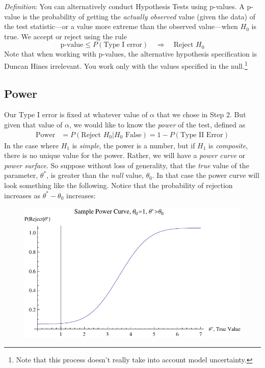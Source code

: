 \documentclass[a4paper,12pt]{scrartcl}
\begin{document}
{\sl Definition}: You can alternatively conduct Hypothesis Tests using 
p-values. A p-value is the probability of getting the 
\emph{actually observed} value (given the data) of the test 
statistic---or a value more extreme than the observed value---when
$H_0$ is true. We accept or reject using the rule
\[ \text{p-value} \leq P(\text{Type I error}) \quad 
   \Rightarrow \quad \text{Reject $H_0$} \]
Note that when working with p-values, the alternative hypothesis
specification is Duncan Hines irrelevant. You work only with the
values specified in the null.\footnote{Note that this process doesn't
really take into account model uncertainty.}


\subsection{Power}

Our Type I error is fixed at whatever value of $\alpha$ that we
chose in Step 2. But given that value of $\alpha$, we would like
to know the \emph{power} of the test, defined as
\begin{align*}
   \text{Power} &= P(\text{Reject $H_0$} | H_0 \text{ False}) 
   =1 - P(\text{Type II Error})
\end{align*}
In the case where $H_1$ is \emph{simple}, the
power is a number, but if $H_1$ is \emph{composite}, there is 
no unique value for the power.  Rather, we will have a 
\emph{power curve}
or \emph{power surface}. So suppose without loss
of generality, that the \emph{true} value of the parameter, $\theta^*$,
is greater than the \emph{null} value, $\theta_0$. 
In that case the power curve
will look something like the following.
Notice that the probability of rejection increases as 
$\theta^*-\theta_0$ increases:
\begin{figure}[h!]
   \centering
   \includegraphics[scale=0.7]{SamplePowerCurve.pdf}
\end{figure}
\end{document}
